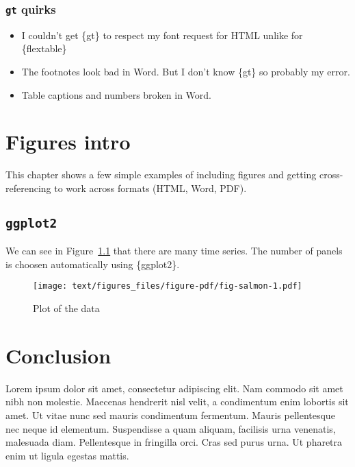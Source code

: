 \documentclass[
  letterpaper,
  oneside]{scrbook}
\providecommand{\tightlist}{%
  \setlength{\itemsep}{0pt}\setlength{\parskip}{0pt}}\usepackage{longtable,booktabs,array}
\begin{document}
\hypertarget{gt-quirks}{%
\subsection{\texorpdfstring{\texttt{gt}
quirks}{gt quirks}}\label{gt-quirks}}

\begin{itemize}
\tightlist
\item
  I couldn't get \{gt\} to respect my font request for HTML unlike for
  \{flextable\}
\item
  The footnotes look bad in Word. But I don't know \{gt\} so probably my
  error.
\item
  Table captions and numbers broken in Word.
\end{itemize}


\hypertarget{figures-intro}{%
\chapter{Figures intro}\label{figures-intro}}

This chapter shows a few simple examples of including figures and
getting cross-referencing to work across formats (HTML, Word, PDF).

\hypertarget{ggplot2}{%
\section{\texorpdfstring{\texttt{ggplot2}}{ggplot2}}\label{ggplot2}}

We can see in Figure~\ref{fig-salmon} that there are many time series.
The number of panels is choosen automatically using \{ggplot2\}.

\begin{figure}

{\centering \texttt{[image: text/figures\_files/figure-pdf/fig-salmon-1.pdf]}

}

\caption{\label{fig-salmon}Plot of the data}

\end{figure}


\hypertarget{conclusion}{%
\chapter{Conclusion}\label{conclusion}}

Lorem ipsum dolor sit amet, consectetur adipiscing elit. Nam commodo sit
amet nibh non molestie. Maecenas hendrerit nisl velit, a condimentum
enim lobortis sit amet. Ut vitae nunc sed mauris condimentum fermentum.
Mauris pellentesque nec neque id elementum. Suspendisse a quam aliquam,
facilisis urna venenatis, malesuada diam. Pellentesque in fringilla
orci. Cras sed purus urna. Ut pharetra enim ut ligula egestas mattis.
\end{document}
